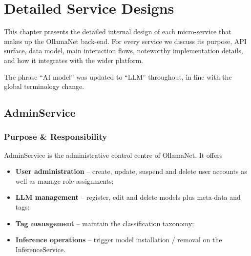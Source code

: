 \def\chapdir{./Chapter06}

\chapter{Detailed Service Designs} \label{ch:service-designs}

This chapter presents the detailed internal design of each micro-service that makes up the OllamaNet back-end.  For every service we discuss its purpose, API surface, data model, main interaction flows, noteworthy implementation details, and how it integrates with the wider platform.

The phrase “AI model” was updated to “LLM” throughout, in line with the global terminology change.

\section{AdminService}
\subsection{Purpose \& Responsibility}
AdminService is the administrative control centre of OllamaNet.  It offers
\begin{itemize}
  \item \textbf{User administration} – create, update, suspend and delete user accounts as well as manage role assignments;
  \item \textbf{LLM management} – register, edit and delete models plus meta-data and tags;
  \item \textbf{Tag management} – maintain the classification taxonomy;
  \item \textbf{Inference operations} – trigger model installation / removal on the InferenceService.
\end{itemize}

